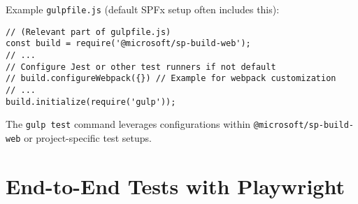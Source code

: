 Example \texttt{gulpfile.js} (default SPFx setup often includes this):
\begin{verbatim}
// (Relevant part of gulpfile.js)
const build = require('@microsoft/sp-build-web');
// ...
// Configure Jest or other test runners if not default
// build.configureWebpack({}) // Example for webpack customization
// ...
build.initialize(require('gulp'));
\end{verbatim}
The \texttt{gulp test} command leverages configurations within \texttt{@microsoft/sp-build-web} or project-specific test setups.

\section{End-to-End Tests with Playwright}
\label{sec:E2ETestsPlaywright}

